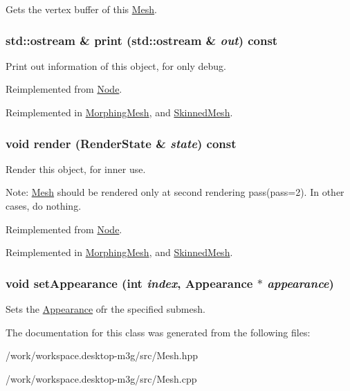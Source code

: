 Gets the vertex buffer of this \hyperlink{classm3g_1_1Mesh}{Mesh}. \hypertarget{classm3g_1_1Mesh_6fea17fa1532df3794f8cb39cb4f911f}{
\subsubsection[{print}]{\setlength{\rightskip}{0pt plus 5cm}std::ostream \& print (std::ostream \& {\em out}) const}}
\label{classm3g_1_1Mesh_6fea17fa1532df3794f8cb39cb4f911f}


Print out information of this object, for only debug. 

Reimplemented from \hyperlink{classm3g_1_1Node_6fea17fa1532df3794f8cb39cb4f911f}{Node}.

Reimplemented in \hyperlink{classm3g_1_1MorphingMesh_6fea17fa1532df3794f8cb39cb4f911f}{MorphingMesh}, and \hyperlink{classm3g_1_1SkinnedMesh_6fea17fa1532df3794f8cb39cb4f911f}{SkinnedMesh}.\hypertarget{classm3g_1_1Mesh_8babc8a79b78615da51161e94029eea9}{
\subsubsection[{render}]{\setlength{\rightskip}{0pt plus 5cm}void render ({\bf RenderState} \& {\em state}) const}}
\label{classm3g_1_1Mesh_8babc8a79b78615da51161e94029eea9}


Render this object, for inner use.

Note: \hyperlink{classm3g_1_1Mesh}{Mesh} should be rendered only at second rendering pass(pass=2). In other cases, do nothing. 

Reimplemented from \hyperlink{classm3g_1_1Node_8babc8a79b78615da51161e94029eea9}{Node}.

Reimplemented in \hyperlink{classm3g_1_1MorphingMesh_8babc8a79b78615da51161e94029eea9}{MorphingMesh}, and \hyperlink{classm3g_1_1SkinnedMesh_8babc8a79b78615da51161e94029eea9}{SkinnedMesh}.\hypertarget{classm3g_1_1Mesh_bb03b872c453c4f8f3fe31e8b54d1b52}{
\subsubsection[{setAppearance}]{\setlength{\rightskip}{0pt plus 5cm}void setAppearance (int {\em index}, \/  {\bf Appearance} $\ast$ {\em appearance})}}
\label{classm3g_1_1Mesh_bb03b872c453c4f8f3fe31e8b54d1b52}


Sets the \hyperlink{classm3g_1_1Appearance}{Appearance} ofr the specified submesh. 

The documentation for this class was generated from the following files:\begin{CompactItemize}
\item 
/work/workspace.desktop-m3g/src/Mesh.hpp\item 
/work/workspace.desktop-m3g/src/Mesh.cpp\end{CompactItemize}

